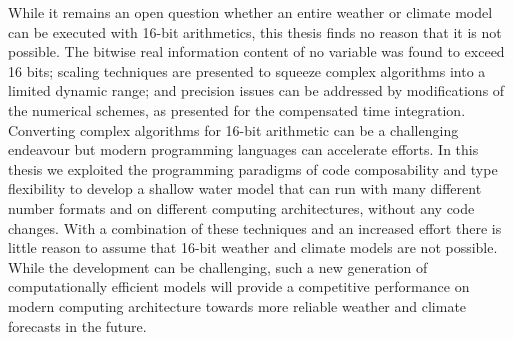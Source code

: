 While it remains an open question whether an entire weather or climate model can be executed with 16-bit arithmetics, this thesis finds no
reason that it is not possible. The bitwise real information content of no variable was found to exceed 16 bits; scaling techniques are
presented to squeeze complex algorithms into a limited dynamic range; and precision issues can be addressed by modifications of the
numerical schemes, as presented for the compensated time integration. Converting complex algorithms for 16-bit arithmetic can be a 
challenging endeavour but modern programming languages can accelerate efforts. In this thesis we exploited the programming paradigms
of code composability and type flexibility to develop a shallow water model that can run with many different number formats and on different
computing architectures, without any code changes. With a combination of these techniques and an increased effort there is little reason
to assume that 16-bit weather and climate models are not possible. While the development can be challenging, such a new generation of
computationally efficient models will provide a competitive performance on modern computing architecture towards more reliable weather
and climate forecasts in the future.



